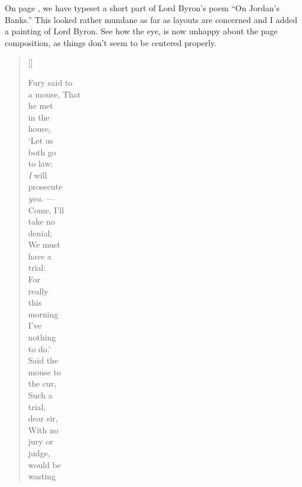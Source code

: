 On page \pageref{pg:byron}, we have typeset a short part of Lord Byron's  poem ``On Jordan's Banks.'' This looked rather mundane as far as layouts are concerned and I added a painting of Lord Byron. See how the eye, is now unhappy about the page composition, as things don't seem to be centered properly.
 \clearpage
 \settowidth{\versewidth}{a mouse that morning}
 \begin{verse}[\versewidth]
 \setlength{\vgap}{1em}
 \begin{patverse}
 \large Fury said to \\
   a mouse, That \\
   he met \\
   in the \\
   house, \\
 \normalsize `Let us \\
   both go \\
   to law: \\
   \emph{I} will \\
   prosecute \\
   \textit{you.} --- \\ 
   Come, I'll \\
 \small take no \\
   denial; \\
   We must \\
   have a \\
   trial: \\
   For \\
 \footnotesize really \\
   this \\
   morning \\
   I've \\
   nothing \\
   to do.' \\
   Said the \\
   mouse to \\
 \scriptsize the cur, \\
   Such a \\
   trial, \\
   dear sir, \\
   With no \\
   jury or \\
   judge, \\
   would be \\
   wasting \\

\end{patverse}
\end{verse}

